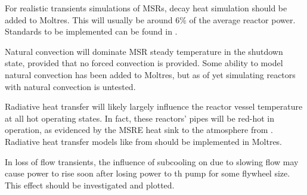 \documentclass[12pt]{article}
\begin{document}
For realistic transients simulations of MSRs, decay heat simulation should be added to Moltres. This will usually be around 6\% of the average reactor power. Standards to be implemented can be found in \cite{decay}.

Natural convection will dominate MSR steady temperature in the shutdown state, provided that no forced convection is provided. Some ability to model natural convection has been added to Moltres, but as of yet simulating reactors with natural convection is untested.

Radiative heat transfer will likely largely influence the reactor vessel temperature at all hot operating states. In fact, these reactors' pipes will be red-hot in operation, as evidenced by the MSRE heat sink to the atmosphere from \cite{robertson_msre}. Radiative heat transfer models like from \cite{schmidt_introduction_1993} should be implemented in Moltres.

In loss of flow transients, the influence of subcooling on due to slowing flow may cause power to rise soon after losing power to th pump for some flywheel size. This effect should be investigated and plotted.

\FloatBarrier

\newpage
\printbibliography
\end{document}
